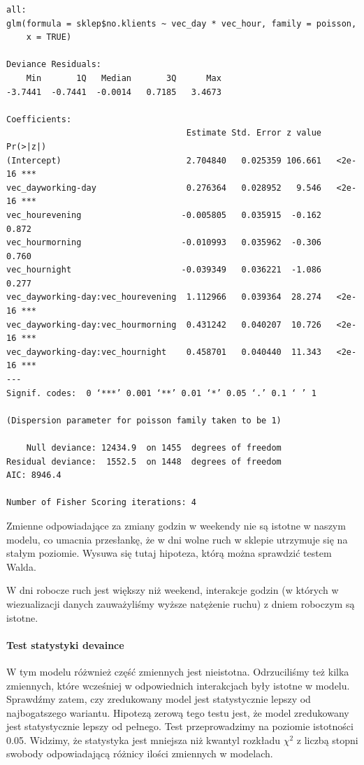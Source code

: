 \documentclass[a4paper,11pt]{article}
\begin{document}
\begin{verbatim}
all:
glm(formula = sklep$no.klients ~ vec_day * vec_hour, family = poisson, 
    x = TRUE)

Deviance Residuals: 
    Min       1Q   Median       3Q      Max  
-3.7441  -0.7441  -0.0014   0.7185   3.4673  

Coefficients:
                                    Estimate Std. Error z value Pr(>|z|)    
(Intercept)                         2.704840   0.025359 106.661   <2e-16 ***
vec_dayworking-day                  0.276364   0.028952   9.546   <2e-16 ***
vec_hourevening                    -0.005805   0.035915  -0.162    0.872    
vec_hourmorning                    -0.010993   0.035962  -0.306    0.760    
vec_hournight                      -0.039349   0.036221  -1.086    0.277    
vec_dayworking-day:vec_hourevening  1.112966   0.039364  28.274   <2e-16 ***
vec_dayworking-day:vec_hourmorning  0.431242   0.040207  10.726   <2e-16 ***
vec_dayworking-day:vec_hournight    0.458701   0.040440  11.343   <2e-16 ***
---
Signif. codes:  0 ‘***’ 0.001 ‘**’ 0.01 ‘*’ 0.05 ‘.’ 0.1 ‘ ’ 1

(Dispersion parameter for poisson family taken to be 1)

    Null deviance: 12434.9  on 1455  degrees of freedom
Residual deviance:  1552.5  on 1448  degrees of freedom
AIC: 8946.4

Number of Fisher Scoring iterations: 4
\end{verbatim}

Zmienne odpowiadające za zmiany godzin w weekendy nie są istotne w naszym modelu, co umacnia przesłankę, że w dni wolne ruch w sklepie utrzymuje się na stałym poziomie. Wysuwa się tutaj hipoteza, którą można sprawdzić testem Walda. 

W dni robocze ruch jest większy niż weekend, interakcje godzin (w których w wiezualizacji danych zauważyliśmy wyższe natężenie ruchu) z dniem roboczym są istotne. 

\paragraph{Test statystyki devaince}

W tym modelu różwnież część zmiennych jest nieistotna. Odrzuciliśmy też kilka zmiennych, które wcześniej w odpowiednich interakcjach były istotne w modelu. Sprawdźmy zatem, czy zredukowany model jest statystycznie lepszy od najbogatszego wariantu. Hipotezą zerową tego testu jest, że model zredukowany jest statystycznie lepszy od pełnego. Test przeprowadzimy na poziomie istotności 0.05. Widzimy, że statystyka jest mniejsza niż kwantyl rozkładu $\chi ^{2}$ z liczbą stopni swobody odpowiadającą różnicy ilości zmiennych w modelach. 
\end{document}
